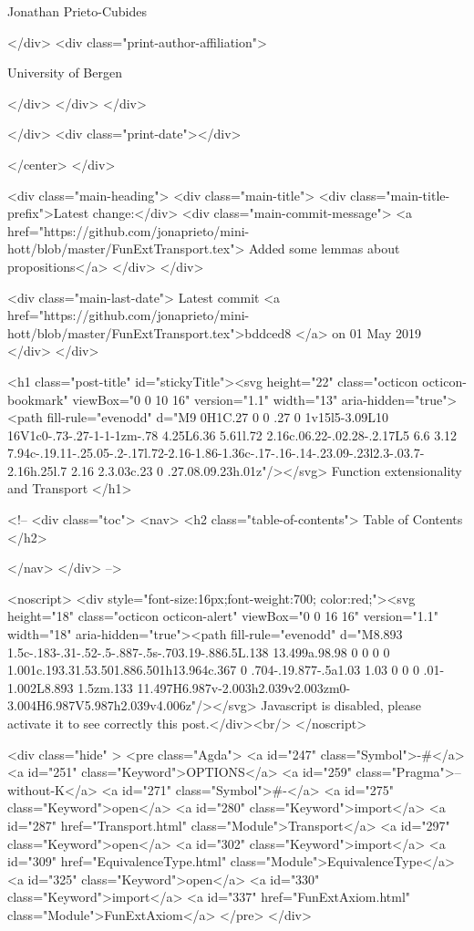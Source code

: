                   Jonathan Prieto-Cubides
                
              </div>
              <div class="print-author-affiliation">
                
                  University of Bergen
                
                </div>
            </div>
          </div>
          
          
        </div>
        <div class="print-date"></div>
        
        
    </center>
  </div>

  
  <div class="main-heading">
    <div class="main-title">
      <div class="main-title-prefix">Latest change:</div>
      <div class="main-commit-message">
            <a href="https://github.com/jonaprieto/mini-hott/blob/master/FunExtTransport.tex">
              Added some lemmas about propositions</a>
      </div>
    </div>

    <div class="main-last-date">
      Latest commit <a href="https://github.com/jonaprieto/mini-hott/blob/master/FunExtTransport.tex">bddced8 </a> on  01 May 2019
    </div>
  </div>
  
  <h1 class="post-title" id="stickyTitle"><svg height="22" class="octicon octicon-bookmark" viewBox="0 0 10 16" version="1.1" width="13" aria-hidden="true"><path fill-rule="evenodd" d="M9 0H1C.27 0 0 .27 0 1v15l5-3.09L10 16V1c0-.73-.27-1-1-1zm-.78 4.25L6.36 5.61l.72 2.16c.06.22-.02.28-.2.17L5 6.6 3.12 7.94c-.19.11-.25.05-.2-.17l.72-2.16-1.86-1.36c-.17-.16-.14-.23.09-.23l2.3-.03.7-2.16h.25l.7 2.16 2.3.03c.23 0 .27.08.09.23h.01z"/></svg> Function extensionality and Transport
  </h1>

  <!-- 
  <div class="toc">
    <nav>
    <h2 class="table-of-contents"> Table of Contents </h2>
      

    </nav>
  </div>
   -->

  <noscript>
  <div style="font-size:16px;font-weight:700; color:red;"><svg height="18" class="octicon octicon-alert" viewBox="0 0 16 16" version="1.1" width="18" aria-hidden="true"><path fill-rule="evenodd" d="M8.893 1.5c-.183-.31-.52-.5-.887-.5s-.703.19-.886.5L.138 13.499a.98.98 0 0 0 0 1.001c.193.31.53.501.886.501h13.964c.367 0 .704-.19.877-.5a1.03 1.03 0 0 0 .01-1.002L8.893 1.5zm.133 11.497H6.987v-2.003h2.039v2.003zm0-3.004H6.987V5.987h2.039v4.006z"/></svg> Javascript is disabled, please activate it to see correctly this post.</div><br/>
  </noscript>

  <div class="hide" >
<pre class="Agda">
<a id="247" class="Symbol">{-#</a> <a id="251" class="Keyword">OPTIONS</a> <a id="259" class="Pragma">--without-K</a> <a id="271" class="Symbol">#-}</a>
<a id="275" class="Keyword">open</a> <a id="280" class="Keyword">import</a> <a id="287" href="Transport.html" class="Module">Transport</a>
<a id="297" class="Keyword">open</a> <a id="302" class="Keyword">import</a> <a id="309" href="EquivalenceType.html" class="Module">EquivalenceType</a>
<a id="325" class="Keyword">open</a> <a id="330" class="Keyword">import</a> <a id="337" href="FunExtAxiom.html" class="Module">FunExtAxiom</a>
</pre>
</div>

